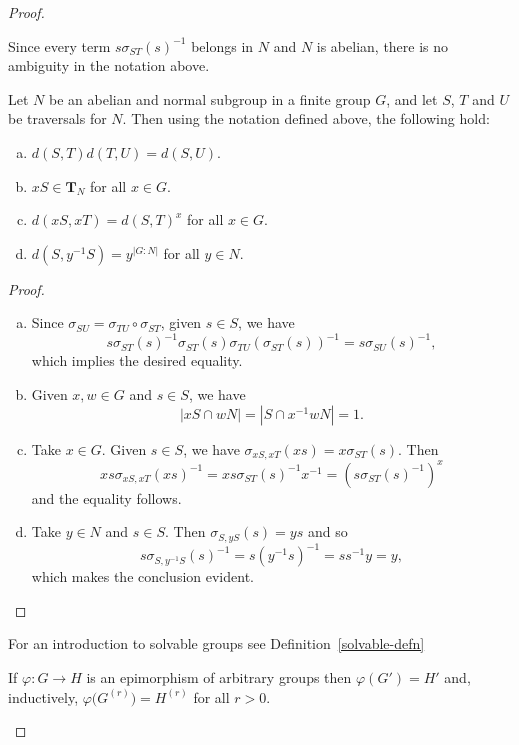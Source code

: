 \begin{proof}
\begin{rem}
    Since every term $s\sigma_{ST}(s)^{-1}$ belongs in $N$ and $N$ is abelian, there is no ambiguity in the notation above.
\end{rem}

\begin{lem}\label{d-identities}
    Let\/ $N$ be an abelian and normal subgroup in a finite group\/ $G$, and let\/ $S$, $T$ and\/ $U$ be traversals for\/ $N$. Then using the notation defined above, the following hold:
    \begin{enumerate}[a),font=\upshape]
        \item $d(S, T)d(T, U) = d(S, U)$.
        \item $xS\in\mathbf T_N$ for all\/ $x\in G$.
        \item $d(xS, xT) = d(S, T)^x$ for all\/ $x \in G$.
        \item $d(S, y^{-1}S) = y^{|G:N|}$ for all\/ $y \in N$.
    \end{enumerate}
\end{lem}

\begin{proof}${}$
\begin{enumerate}[a),font=\upshape]
    \item Since $\sigma_{SU}=\sigma_{TU}\circ\sigma_{ST}$, given $s\in S$, we have
    $$
        s\sigma_{ST}(s)^{-1}\sigma_{ST}(s)\sigma_{TU}(\sigma_{ST}(s))^{-1} = s\sigma_{SU}(s)^{-1},
    $$
    which implies the desired equality.

    \item Given $x,w\in G$ and $s\in S$, we have
    $$
        |xS\cap wN|=|S\cap x^{-1}wN|=1.
    $$

    \item Take $x\in G$. Given $s\in S$, we have $\sigma_{xS,xT}(xs)=x\sigma_{ST}(s)$. Then
    $$
        xs\sigma_{xS,xT}(xs)^{-1} = xs\sigma_{ST}(s)^{-1}x^{-1} = (s\sigma_{ST}(s)^{-1})^x
    $$
    and the equality follows.

    \item Take $y\in N$ and $s\in S$. Then $\sigma_{S,yS}(s)=ys$ and so
    $$
        s\sigma_{S,y^{-1}S}(s)^{-1}=s(y^{-1}s)^{-1}=ss^{-1}y=y,
    $$
    which makes the conclusion evident.
\end{enumerate}
\end{proof}

For an introduction to solvable groups see Definition~\ref{solvable-defn} 

\begin{rem}
    If\/ $\varphi\colon G\to H$ is an epimorphism of arbitrary groups then\/ $\varphi(G')=H'$ and, inductively, $\varphi\big(G^{(r)}\big) = H^{(r)}$ for all\/ $r>0$.
\end{rem}


\end{proof}
